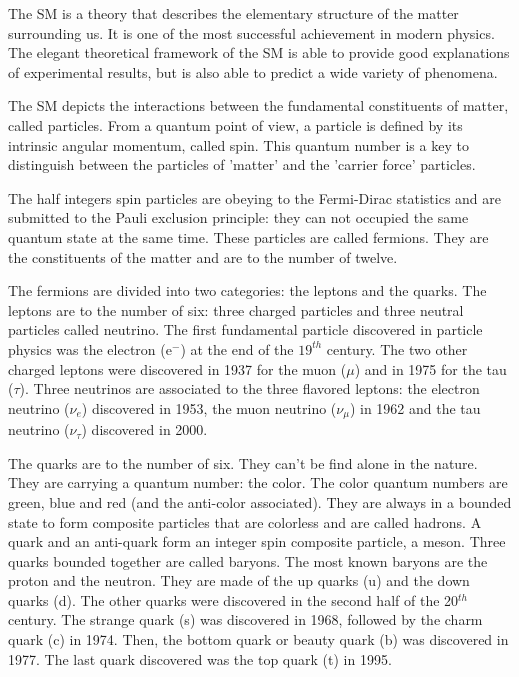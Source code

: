     The \acrfull{SM} is a theory that describes the elementary structure of the matter surrounding us. 
    It is one of the most successful achievement in modern physics.
    The elegant theoretical framework of the \acrshort{SM} is able to provide good explanations of experimental results, but is also able to predict a wide variety of phenomena.

    The \acrshort{SM} depicts the interactions between the fundamental constituents of matter, called particles.
    From a quantum point of view, a particle is defined by its intrinsic angular momentum, called spin. 
    This quantum number is a key to distinguish between the particles of 'matter' and the 'carrier force' particles.
    
    The half integers spin particles are obeying to the Fermi-Dirac statistics and are submitted to the Pauli exclusion principle:
    they can not occupied the same quantum state at the same time.
    These particles are called fermions.
    They are the constituents of the matter and are to the number of twelve.

    The fermions are divided into two categories: the leptons and the quarks. 
    The leptons are to the number of six: three charged particles and three neutral particles called neutrino.
    The first fundamental particle discovered in particle physics was the electron (e$^-$) at the end of the $19^{th}$ century.
    The two other charged leptons were discovered in 1937 for the muon ($\mu$) and in 1975 for the tau ($\tau$).
    Three neutrinos are associated to the three flavored leptons: the electron neutrino ($\nu_e$) discovered in 1953, the muon neutrino ($\nu_{\mu}$) in 1962 and the tau neutrino ($\nu_{\tau}$) discovered in 2000.

    The quarks are to the number of six.
    They can't be find alone in the nature.
    They are carrying a quantum number: the color.
    The color quantum numbers are green, blue and red (and the anti-color associated).
    They are always in a bounded state to form composite particles that are colorless and are called hadrons.
    A quark and an anti-quark form an integer spin composite particle, a meson.
    Three quarks bounded together are called baryons. The most known baryons are the proton and the neutron.
    They are made of the up quarks (u) and the down quarks (d).
    The other quarks were discovered in the second half of the 20$^{th}$ century.
    The strange quark (s) was discovered in 1968, followed by the charm quark (c) in 1974.
    Then, the bottom quark or beauty quark (b) was discovered in 1977.
    The last quark discovered was the top quark (t) in 1995.  

